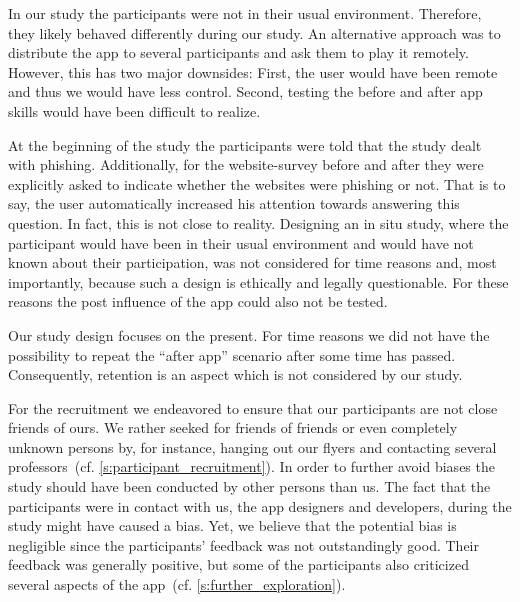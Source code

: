 \begin{description}[leftmargin=0cm]
	\item[Behavior Change] In our study the participants were not in their usual environment. 
	Therefore, they likely behaved differently during our study.
	An alternative approach was to distribute the app to several participants and ask them to play it remotely.
	However, this has two major downsides: First, the user would have been remote and thus we would have less control.
	Second, testing the before and after app skills would have been difficult to realize.
	\item[Increased Attention] At the beginning of the study the participants were told that the study dealt with phishing.
	Additionally, for the website-survey before and after they were explicitly asked to indicate whether the websites were phishing or not.
	That is to say, the user automatically increased his attention towards answering this question.
	In fact, this is not close to reality.
	Designing an in situ study, where the participant would have been in their usual environment and would have not known about their participation, was not considered for time reasons and, most importantly, because such a design is ethically and legally questionable. 
	For these reasons the post influence of the app could also not be tested.
	\item[Retention] Our study design focuses on the present.
	For time reasons we did not have the possibility to repeat the ``after app'' scenario after some time has passed.
	Consequently, retention is an aspect which is not considered by our study.
	\item[Bias] For the recruitment we endeavored to ensure that our participants are not close friends of ours. 
	We rather seeked for friends of friends or even completely unknown persons by, for instance, hanging out our flyers and contacting several professors~(cf. \autoref{s:participant_recruitment}).
	In order to further avoid biases the study should have been conducted by other persons than us.
	The fact that the participants were in contact with us, the app designers and developers, during the study might have caused a bias.
	Yet, we believe that the potential bias is negligible since the participants' feedback was not outstandingly good.
	Their feedback was generally positive, but some of the participants also criticized several aspects of the app~(cf. \autoref{s:further_exploration}).
\end{description}

